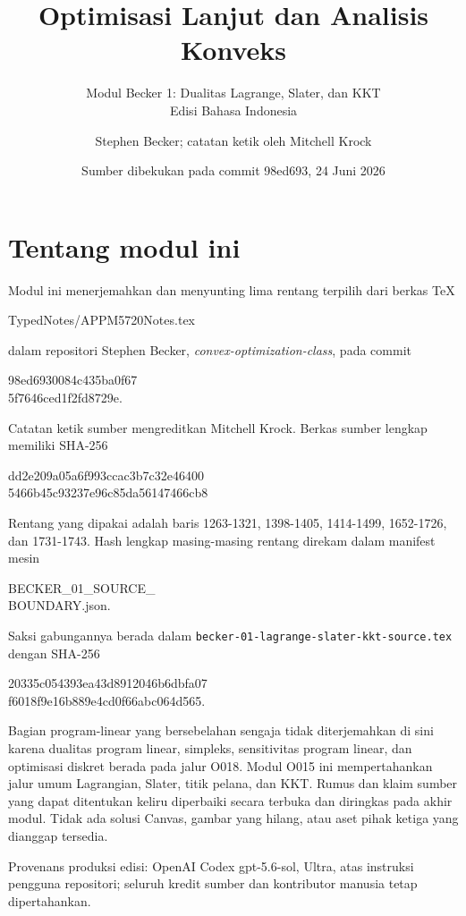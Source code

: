\documentclass[indonesian]{shinybook}
\title{Optimisasi Lanjut dan Analisis Konveks}
\subtitle{Modul Becker 1: Dualitas Lagrange, Slater, dan KKT\\Edisi Bahasa Indonesia}
\author{Stephen Becker; catatan ketik oleh Mitchell Krock}
\date{Sumber dibekukan pada commit 98ed693, 24 Juni 2026}
\begin{document}
\maketitle

\frontmatter
\chapter*{Tentang modul ini}
Modul ini menerjemahkan dan menyunting lima rentang terpilih dari berkas TeX
\begin{center}\small\ttfamily
TypedNotes/APPM5720Notes.tex
\end{center}
dalam repositori Stephen Becker, \emph{convex-optimization-class}, pada commit
\begin{center}\small\ttfamily
98ed6930084c435ba0f67\\[-0.2em]
5f7646ced1f2fd8729e.
\end{center}
Catatan ketik sumber mengreditkan Mitchell Krock. Berkas sumber lengkap
memiliki SHA-256
\begin{center}\small\ttfamily
dd2e209a05a6f993ccac3b7c32e46400\\[-0.2em]
5466b45c93237e96c85da56147466cb8
\end{center}

Rentang yang dipakai adalah baris 1263-1321, 1398-1405, 1414-1499,
1652-1726, dan 1731-1743. Hash lengkap masing-masing rentang direkam dalam
manifest mesin
\begin{center}\small\ttfamily
BECKER\_01\_SOURCE\_\\[-0.2em]
BOUNDARY.json.
\end{center}
Saksi gabungannya berada dalam
\texttt{becker-01-lagrange-slater-kkt-source.tex} dengan SHA-256
\begin{center}\small\ttfamily
20335c054393ea43d8912046b6dbfa07\\[-0.2em]
f6018f9e16b889e4cd0f66abc064d565.
\end{center}

Bagian program-linear yang bersebelahan sengaja tidak diterjemahkan di sini
karena dualitas program linear, simpleks, sensitivitas program linear, dan
optimisasi diskret berada pada jalur O018. Modul O015 ini mempertahankan jalur
umum Lagrangian, Slater, titik pelana, dan KKT. Rumus dan klaim sumber yang
dapat ditentukan keliru diperbaiki secara terbuka dan diringkas pada akhir
modul. Tidak ada solusi Canvas, gambar yang hilang, atau aset pihak ketiga yang
dianggap tersedia.

Provenans produksi edisi: OpenAI Codex gpt-5.6-sol, Ultra, atas instruksi
pengguna repositori; seluruh kredit sumber dan kontributor manusia tetap
dipertahankan.
\end{document}

